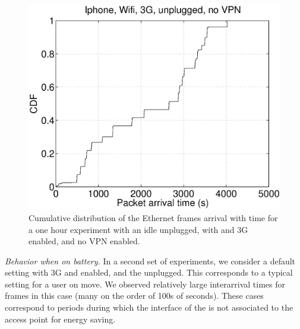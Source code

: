 \begin{figure}
\centering
        \includegraphics[width=0.8\linewidth]{../../code/pushNotification/Fig/bw_iphone_wifi_3g_unplug_novpn_ts.eps}
  \caption{Cumulative distribution of the Ethernet frames
          arrival with time for a one hour experiment with an idle
          \iphone{} unplugged, with \wifi{} and 3G enabled, and no VPN
          enabled.}
  \label{fig:push_w3_ts}
\end{figure}

\emph{Behavior when on battery.} 
In a second set of experiments, we consider a default \iphone{}
setting with 3G and \wifi{} enabled, and the \iphone{} unplugged. This
corresponds to a typical setting for a user on move.  We observed 
relatively large interarrival times for frames in this case (many on the order of 100s of 
seconds). These cases correspond to
periods during which the \wifi interface of the \iphone{} is not
associated to the access point for energy saving. 





